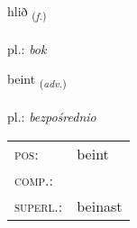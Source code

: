 \documentclass[frontgrid, backgrid]{flacards}\usepackage[]{graphicx}\usepackage[]{xcolor}
\begin{document}
\renewcommand{\flhead}{\vskip5pt \fboxsep=0pt {\small\bfseries\footnotesize Nafnorð | rzeczownik}}
\renewcommand{\fcfoot}{\vskip5pt \fboxsep=0pt \hspace{2pt}{\small\bfseries\footnotesize 1K}}

\renewcommand{\blhead}{\vskip5pt {\small\bfseries\footnotesize Nafnorð | rzeczownik }}
\renewcommand{\bcfoot}{\vskip5pt \hspace{2pt}{\small\bfseries\footnotesize 1K}}


{hlið \small{\textsubscript{(\textit{f.})}} \\[1ex] %
\textphonetic{[l̥ɪːð]} \\
pl.: \emph{bok} \\  [2ex]
\renewcommand*{\arraystretch}{0.8}
}

\renewcommand{\flhead}{\vskip5pt \fboxsep=0pt {\small\bfseries\footnotesize Atviksorð | przysłówek}}
\renewcommand{\fcfoot}{\vskip5pt \fboxsep=0pt \hspace{2pt}{\small\bfseries\footnotesize 1K}}

\renewcommand{\blhead}{\vskip5pt {\small\bfseries\footnotesize Atviksorð | przysłówek }}
\renewcommand{\bcfoot}{\vskip5pt \hspace{2pt}{\small\bfseries\footnotesize 1K}}


{beint \small{\textsubscript{(\textit{adv.})}} \\[1ex] %
\textphonetic{[pein̥t]} \\
pl.: \emph{bezpośrednio} \\  [2ex]
\renewcommand*{\arraystretch}{0.8}
\begin{tabular}{ll}
\textsc{pos}: & beint \\ 
\textsc{comp.}: &  \\ 
\textsc{superl.}: & beinast \\
\end{tabular}
}
\end{document}
